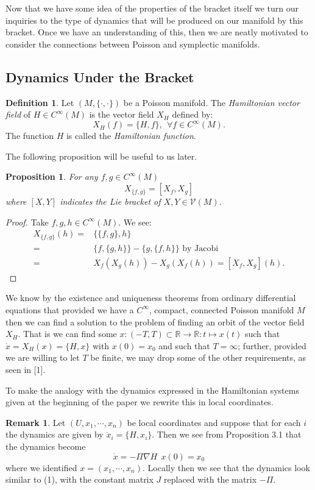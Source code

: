 \documentclass[psamsfonts,12pt]{amsart}
\newcommand\0{\mathbf{0}}
\theoremstyle{plain}
\newtheorem{prop}[thm]{Proposition}
\theoremstyle{definition}
\newtheorem{dfn}[thm]{Definition} %
\newtheorem{rmk}[thm]{Remark}
\newcommand{\bbR}{\mathbb{R}}
\newcommand{\sV}{\mathcal{V}}
\begin{document}
Now that we have some idea of the properties of the bracket itself we turn our inquiries to the type of dynamics that will be produced on our manifold by this bracket.  Once we have an understanding of this, then we are neatly motivated to consider the connections between Poisson and symplectic manifolds.





\subsection{Dynamics Under the Bracket}


\begin{dfn}
Let $(M,\{\cdot,\cdot\})$ be a Poisson manifold.  The \textit{Hamiltonian vector field} of $H\in C^\infty(M)$ is the vector field $X_H$ defined by:
\[
X_H(f)=\{H,f\}, \ \ \forall f\in C^\infty(M).
\]
The function $H$ is called the \textit{Hamiltonian function}.
\end{dfn}

The following proposition will be useful to us later.

\begin{prop}
For any $f,g\in C^\infty(M)$
\[
X_{\{f,g\}}=[X_f,X_g]
\]
where $[X,Y]$ indicates the Lie bracket of $X,Y\in \sV(M)$.
\end{prop}
\begin{proof}
Take $f,g,h\in C^\infty(M)$.  We see:
\begin{align*}
X_{\{f,g\}}(h)=&\{\{f,g\},h\}\\
=&\{f,\{g,h\}\}- \{g,\{f,h\}\} \text{ by Jacobi}\\
=& X_f(X_g(h))-X_g(X_f(h))=[X_f,X_g](h).
\end{align*}
\end{proof}


We know by the existence and uniqueness theorems from ordinary differential equations that provided we have a $C^\infty$, compact, connected Poisson manifold $M$ then we can find a solution to the problem of finding an orbit of the vector field $X_H$.  That is we can find some $x\colon (-T,T)\subset \bbR\rightarrow \bbR\colon t\mapsto x(t)$ such that $\dot{x}=X_H(x)=\{H,x\}$ with $x(0)=x_0$ and such that $T=\infty$; further, provided we are willing to let $T$ be finite, we may drop some of the other requirements, as seen in [1].

To make the analogy with the dynamics expressed in the Hamiltonian systems given at the beginning of the paper we rewrite this in local coordinates.
\begin{rmk}
Let $(U,x_1,\cdots, x_n)$ be local coordinates and suppose that for each $i$ the dynamics are given by $\dot{x}_i=\{H,x_i\}$.  Then we see from Proposition 3.1 that the dynamics become
\[
\dot{x}=-\Pi \nabla H \ \ x(0)=x_0
\]
where we identified $x=(x_1,\cdots,x_n)$.  Locally then we see that the dynamics look similar to (1), with the constant matrix $J$ replaced with the matrix $-\Pi$.
\end{rmk}
\end{document}
